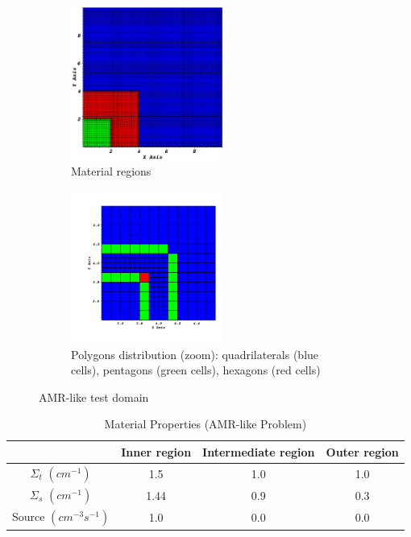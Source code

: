 \documentclass[preprint,10pt]{elsarticle}
\renewcommand{\(}{\left(}
\renewcommand{\)}{\right)}
\renewcommand{\[}{\left[}
\renewcommand{\]}{\right]}
\begin{document}
\begin{figure}[!htbp]
  \centering
  \begin{subfigure}{0.45\textwidth}
    \centering
    \includegraphics[width=5cm]{zone_amr}
    \caption{Material regions}
    \label{mat_amr}
  \end{subfigure}
  \begin{subfigure}{0.53\textwidth}
    \centering
    \includegraphics[width=5cm]{amr_grid0001}
    \caption{Polygons distribution (zoom): quadrilaterals (blue cells),  pentagons (green cells),  hexagons (red cells)}
    \label{fig_pol_dist}
  \end{subfigure}
  \caption{AMR-like test domain}
\end{figure}
%
\begin{table}
  \begin{center}
    \caption{Material Properties (AMR-like Problem)}
    \begin{tabular}{|c|c|c|c|}
      \hline
      & Inner region & Intermediate region & Outer region  \\ \hline
    $\Sigma_t$ $(cm^{-1})$ & 1.5  & 1.0 & 1.0 \\
    $\Sigma_s$ $(cm^{-1})$ & 1.44 & 0.9 & 0.3 \\
  Source $(cm^{-3}s^{-1})$ & 1.0  & 0.0 & 0.0 \\
      \hline
    \end{tabular}
    \label{prop_amr}
  \end{center}
\end{table}
\end{document}
